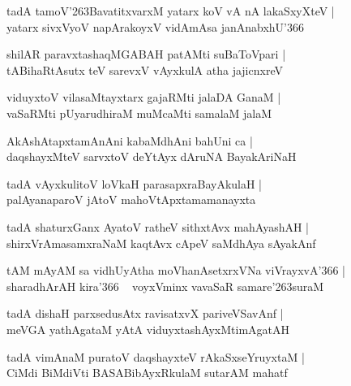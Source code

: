 \documentclass[twoside,12pt,openright]{book}
\def\S{\char'263}
\newcounter{shloka}[chapter]
\begin{document}
\begin{shloka}%
tadA tamoV\S BavatitxvarxM yatarx koV vA nA lakaSxyXteV |\\
yatarx sivxVyoV napArakoyxV vidAmAsa janAnabxhU\char'366
\end{shloka}

\begin{shloka}%
shilAR paravxtashaqMGABAH patAMti suBaToVpari |\\
tABihaRtAsutx teV sarevxV vAyxkulA atha jajicnxreV 
\end{shloka}

\begin{shloka}%
viduyxtoV vilasaMtayxtarx gajaRMti jalaDA GanaM |\\
vaSaRMti pUyarudhiraM muMcaMti samalaM jalaM 
\end{shloka}

\begin{shloka}%
AkAshAtapxtamAnAni kabaMdhAni bahUni ca |\\
daqshayxMteV sarvxtoV deYtAyx dAruNA BayakAriNaH 
\end{shloka}

\begin{shloka}%
tadA vAyxkulitoV loVkaH parasapxraBayAkulaH |\\
palAyanaparoV jAtoV mahoVtApxtamamanayxta
\end{shloka}

\begin{shloka}%
tadA shaturxGanx AyatoV ratheV sithxtAvx mahAyashAH |\\
shirxVrAmasamxraNaM kaqtAvx cApeV saMdhAya sAyakAnf
\end{shloka}

\begin{shloka}%
tAM mAyAM sa vidhUyAtha moVhanAsetxrxVNa viVrayxvA\char'366 |\\
sharadhArAH kira\char'366 ~ voyxVminx vavaSaR samare\S suraM 
\end{shloka}

\begin{shloka}%
tadA dishaH parxsedusAtx ravisatxvX pariveVSavAnf |\\
meVGA yathAgataM yAtA viduyxtashAyxMtimAgatAH 
\end{shloka}

\begin{shloka}%
tadA vimAnaM puratoV daqshayxteV rAkaSxseYruyxtaM |\\
CiMdi BiMdiVti BASABibAyxRkulaM sutarAM mahatf 
\end{shloka}
\end{document}
